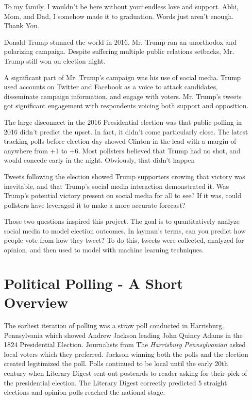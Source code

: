 \documentclass[11pt, twoside, reqno]{book}
\begin{document}
To my family. I wouldn't be here without your endless love and support. Abhi, Mom, and Dad, I somehow made it to graduation. Words just aren't enough. Thank You.  

\startmain

\intro
\hspace{0.2in}Donald Trump stunned the world in 2016. Mr. Trump ran an unorthodox and polarizing campaign. Despite suffering multiple public relations setbacks, Mr. Trump still won on election night.

A significant part of Mr. Trump's campaign was his use of social media. Trump used accounts on Twitter and Facebook as a voice to attack candidates, disseminate campaign information, and engage with voters. Mr. Trump's tweets got significant engagement with respondents voicing both support and opposition. 

The large disconnect in the 2016 Presidential election was that public polling in 2016 didn’t predict the upset. In fact, it didn’t come particularly close. The latest tracking polls before election day showed Clinton in the lead with a margin of anywhere from +1 to +6\cite{gallup}. Most pollsters believed that Trump had no shot, and would concede early in the night. Obviously, that didn’t happen

Tweets following the election showed Trump supporters crowing that victory was inevitable, and that Trump’s social media interaction demonstrated it. Was Trump’s potential victory present on social media for all to see? If it was, could pollsters have leveraged it to make a more accurate forecast?

Those two questions inspired this project. The goal is to quantitatively analyze social media to model election outcomes. In layman's terms, can you predict how people vote from how they tweet? To do this, tweets were collected, analyzed for opinion, and then used to model with machine learning techniques. 

\section{Political Polling - A Short Overview}
\hspace{0.2in} The earliest iteration of polling was a straw poll conducted in Harrisburg, Pennsylvania which showed Andrew Jackson leading John Quincy Adams in the 1824 Presidential Election. Journalists from The \textit{Harrisburg Pennsylvanian} asked local voters which they preferred. Jackson winning both the polls and the election created legitimized the poll. Polls continued to be local until the early 20th century when Literary Digest sent out postcards to reader asking for their pick of the presidential election. The Literary Digest correctly predicted 5 straight elections and opinion polls reached the national stage. 
\end{document}
